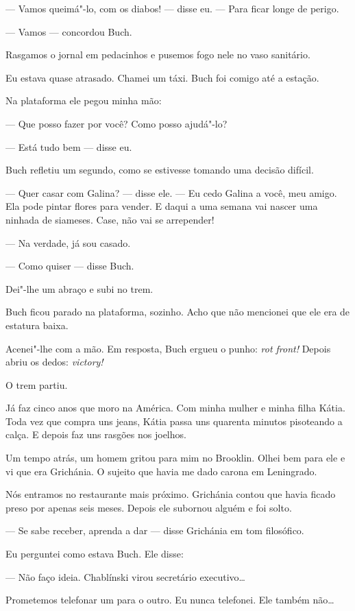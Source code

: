 --- Vamos queimá"-lo, com os diabos! --- disse eu. --- Para ficar longe
de perigo.

--- Vamos --- concordou Buch.

Rasgamos o jornal em pedacinhos e pusemos fogo nele no vaso sanitário.

Eu estava quase atrasado. Chamei um táxi. Buch foi comigo até a estação.

Na plataforma ele pegou minha mão:

--- Que posso fazer por você? Como posso ajudá"-lo?

--- Está tudo bem --- disse eu.

Buch refletiu um segundo, como se estivesse tomando uma decisão difícil. \label{ref5}

--- Quer casar com Galina? --- disse ele. --- Eu cedo Galina a você, meu
amigo. Ela pode pintar flores para vender. E daqui a uma semana vai
nascer uma ninhada de siameses. Case, não vai se arrepender!

--- Na verdade, já sou casado.

--- Como quiser --- disse Buch.

Dei"-lhe um abraço e subi no trem.

Buch ficou parado na plataforma, sozinho. Acho que não mencionei que ele
era de estatura baixa.

Acenei"-lhe com a mão. Em resposta, Buch ergueu o punho: \emph{rot
front!} Depois abriu os dedos: \emph{victory!}

O trem partiu.

\bigskip

Já faz cinco anos que moro na América. Com minha mulher e minha filha
Kátia. Toda vez que compra uns jeans, Kátia passa uns quarenta minutos
pisoteando a calça. E depois faz uns rasgões nos joelhos.

Um tempo atrás, um homem gritou para mim no Brooklin. Olhei bem para ele
e vi que era Grichánia. O sujeito que havia me dado carona em
Leningrado.

Nós entramos no restaurante mais próximo. Grichánia contou que havia
ficado preso por apenas seis meses. Depois ele subornou alguém e foi
solto.

--- Se sabe receber, aprenda a dar --- disse Grichánia em tom
filosófico.

Eu perguntei como estava Buch. Ele disse:

--- Não faço ideia. Chablínski virou secretário executivo\ldots{}

Prometemos telefonar um para o outro. Eu nunca telefonei. Ele também
não\ldots{}

